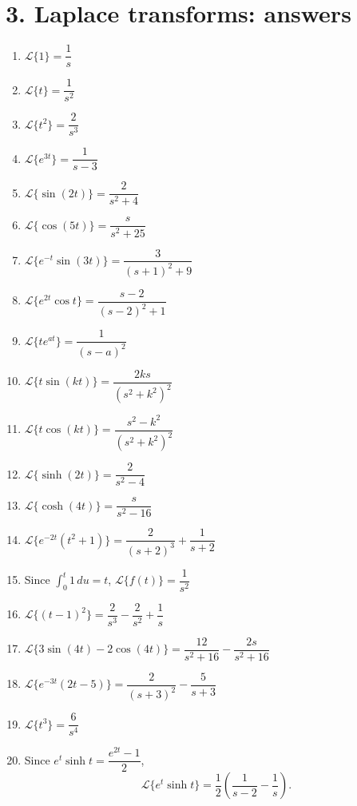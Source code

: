 \documentclass[11pt,a4paper]{article}
\begin{document}
\section*{3. Laplace transforms: answers}
\begin{enumerate}
    \item $\mathcal{L}\{1\}=\dfrac{1}{s}$
    \item $\mathcal{L}\{t\}=\dfrac{1}{s^2}$
    \item $\mathcal{L}\{t^2\}=\dfrac{2}{s^3}$
    \item $\mathcal{L}\{e^{3t}\}=\dfrac{1}{s-3}$
    \item $\mathcal{L}\{\sin(2t)\}=\dfrac{2}{s^2+4}$
    \item $\mathcal{L}\{\cos(5t)\}=\dfrac{s}{s^2+25}$
    \item $\mathcal{L}\{e^{-t}\sin(3t)\}=\dfrac{3}{(s+1)^2+9}$
    \item $\mathcal{L}\{e^{2t}\cos t\}=\dfrac{s-2}{(s-2)^2+1}$
    \item $\mathcal{L}\{t e^{at}\}=\dfrac{1}{(s-a)^2}$
    \item $\mathcal{L}\{t\sin(kt)\}=\dfrac{2ks}{(s^2+k^2)^2}$
    \item $\mathcal{L}\{t\cos(kt)\}=\dfrac{s^2-k^2}{(s^2+k^2)^2}$
    \item $\mathcal{L}\{\sinh(2t)\}=\dfrac{2}{s^2-4}$
    \item $\mathcal{L}\{\cosh(4t)\}=\dfrac{s}{s^2-16}$
    \item $\mathcal{L}\{e^{-2t}(t^2+1)\}=\dfrac{2}{(s+2)^3}+\dfrac{1}{s+2}$
    \item Since $\int_0^t 1\,du=t$, \quad $\mathcal{L}\{f(t)\}=\dfrac{1}{s^2}$
    \item $\mathcal{L}\{(t-1)^2\}=\dfrac{2}{s^3}-\dfrac{2}{s^2}+\dfrac{1}{s}$
    \item $\mathcal{L}\{3\sin(4t)-2\cos(4t)\}=\dfrac{12}{s^2+16}-\dfrac{2s}{s^2+16}$
    \item $\mathcal{L}\{e^{-3t}(2t-5)\}=\dfrac{2}{(s+3)^2}-\dfrac{5}{s+3}$
    \item $\mathcal{L}\{t^3\}=\dfrac{6}{s^4}$
    \item Since $e^t\sinh t=\dfrac{e^{2t}-1}{2}$,
    \[
        \mathcal{L}\{e^t\sinh t\}=\frac{1}{2}\left(\frac{1}{s-2}-\frac{1}{s}\right).
    \]
\end{enumerate}
\end{document}
